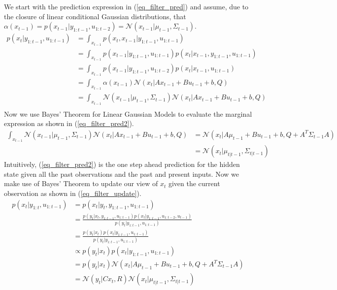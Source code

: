 \documentclass[../masters.tex]{subfiles}
\begin{document}
We start with the prediction expression in (\ref{eq_filter_pred}) and assume, due to the closure of linear conditional Gaussian distributions, that $\alpha(x_{t-1}) = p(x_{t-1}|y_{1:t-1}, u_{1:t-2}) = \mathcal{N}(x_{t-1}|\mu_{t-1}, \Sigma_{t-1}) $. 
\begin{equation}
\begin{aligned}
p(x_t|y_{1:t-1}, u_{1:t-1}) &= \int_{x_{t-1}} p(x_t,x_{t-1}|y_{1:t-1}, u_{1:t-1}) \\
&= \int_{x_{t-1}} p(x_{t-1}|y_{1:t-1}, u_{1:t-1})p(x_{t}|x_{t-1}, y_{1:t-1}, u_{1:t-1}) \\
&= \int_{x_{t-1}} p(x_{t-1}|y_{1:t-1}, u_{1:t-2})p(x_{t}|x_{t-1}, u_{1:t-1}) \\
&= \int_{x_{t-1}} \alpha(x_{t-1})\mathcal{N}(x_{t}|Ax_{t-1}+Bu_{t-1} +b, Q) \\
&= \int_{x_{t-1}} \mathcal{N}(x_{t-1}|\mu_{t-1}, \Sigma_{t-1}) \mathcal{N}(x_{t}|Ax_{t-1}+Bu_{t-1} +b, Q) \\
\end{aligned}
\label{eq_filter_pred}
\end{equation} 
Now we use Bayes' Theorem for Linear Gaussian Models to evaluate the marginal expression as shown in (\ref{eq_filter_pred2}).
\begin{equation}
\begin{aligned}
\int_{x_{t-1}} \mathcal{N}(x_{t-1}|\mu_{t-1}, \Sigma_{t-1}) \mathcal{N}(x_{t}|Ax_{t-1}+Bu_{t-1} +b, Q) &= \mathcal{N}(x_t|A\mu_{t-1}+Bu_{t-1
}+b, Q+ A^T\Sigma_{t-1}A) \\
&= \mathcal{N}(x_t|\mu_{t|t-1},\Sigma_{t|t-1})
\end{aligned}
\label{eq_filter_pred2}
\end{equation}
Intuitively, (\ref{eq_filter_pred2}) is the one step ahead prediction for the hidden state given all the past observations and the past and present inputs. Now we make use of Bayes' Theorem to update our view of $x_t$ given the current observation as shown in (\ref{eq_filter_update}).
\begin{equation}
\begin{aligned}
p(x_t|y_{1:t},u_{1:t-1}) &= p(x_t|y_{t},y_{1:t-1},u_{1:t-1}) \\
&= \frac{p(y_t|x_t,y_{1:t-1},u_{1:t-1})p(x_t|y_{1:t-1},u_{1:t-2}, u_{t-1})}{p(y_t|y_{1:t-1},u_{1:t-1})} \\
&= \frac{p(y_t|x_t)p(x_t|y_{1:t-1},u_{1:t-1})}{p(y_t|y_{1:t-1},u_{1:t-1})} \\
&\propto p(y_t|x_t)p(x_t|y_{1:t-1},u_{1:t-1})\\
&= p(y_t|x_t)\mathcal{N}(x_t|A\mu_{t-1}+Bu_{t-1
}+b, Q+ A^T\Sigma_{t-1}A) \\
&= \mathcal{N}(y_{t}|Cx_{t}, R)\mathcal{N}(x_t|\mu_{t|t-1},\Sigma_{t|t-1})
\end{aligned}
\label{eq_filter_update}
\end{equation}
\end{document}
